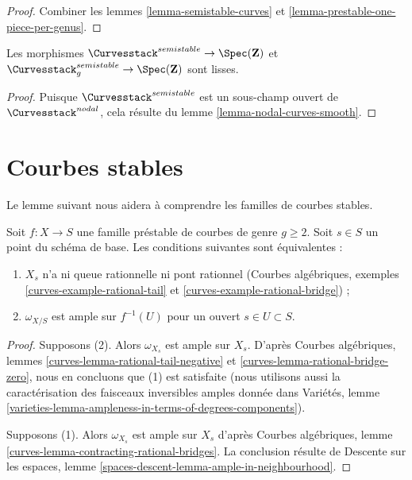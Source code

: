 \begin{proof}
Combiner les lemmes \ref{lemma-semistable-curves} et
\ref{lemma-prestable-one-piece-per-genus}.
\end{proof}

\begin{lemma}
\label{lemma-semistable-curves-smooth}
Les morphismes
$\Curvesstack^{semistable} \to \Spec(\mathbf{Z})$ et
$\Curvesstack^{semistable}_g \to \Spec(\mathbf{Z})$
sont lisses.
\end{lemma}

\begin{proof}
Puisque $\Curvesstack^{semistable}$ est un sous-champ ouvert de
$\Curvesstack^{nodal}$, cela résulte du
lemme \ref{lemma-nodal-curves-smooth}.
\end{proof}







\section{Courbes stables}
\label{section-stable-curves}

\noindent
Le lemme suivant nous aidera à comprendre les familles de courbes stables.

\begin{lemma}
\label{lemma-stable}
Soit $f : X \to S$ une famille préstable de courbes de genre $g \geq 2$.
Soit $s \in S$ un point du schéma de base.
Les conditions suivantes sont équivalentes :
\begin{enumerate}
\item $X_s$ n'a ni queue rationnelle ni
pont rationnel
(Courbes algébriques, exemples
\ref{curves-example-rational-tail} et
\ref{curves-example-rational-bridge}) ;
\item $\omega_{X/S}$ est ample sur $f^{-1}(U)$ pour un ouvert $s \in U \subset S$.
\end{enumerate}
\end{lemma}

\begin{proof}
Supposons (2). Alors $\omega_{X_s}$ est ample sur $X_s$.
D'après Courbes algébriques, lemmes \ref{curves-lemma-rational-tail-negative} et
\ref{curves-lemma-rational-bridge-zero},
nous en concluons que (1) est satisfaite (nous utilisons aussi
la caractérisation des faisceaux inversibles amples donnée dans
Variétés, lemme
\ref{varieties-lemma-ampleness-in-terms-of-degrees-components}).

\medskip\noindent
Supposons (1). Alors $\omega_{X_s}$ est ample sur $X_s$ d'après
Courbes algébriques, lemme \ref{curves-lemma-contracting-rational-bridges}.
La conclusion résulte de Descente sur les espaces, lemme
\ref{spaces-descent-lemma-ample-in-neighbourhood}.
\end{proof}

